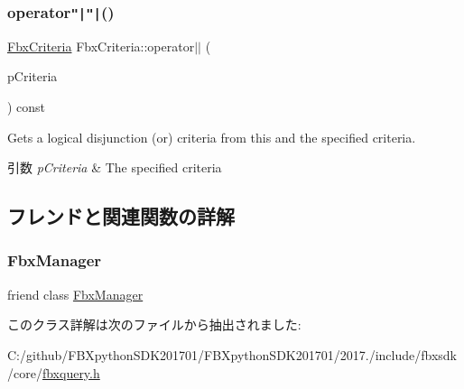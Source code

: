 \mbox{\label{class_fbx_criteria_a550446bf7c351b7cd09098bbe74d5d64}} 
\subsubsection{\texorpdfstring{operator\texttt{"|}\texttt{"|}()}{operator||()}}
{\footnotesize\ttfamily \hyperlink{class_fbx_criteria}{Fbx\+Criteria} Fbx\+Criteria\+::operator$\vert$$\vert$ (\begin{DoxyParamCaption}\item[{const \hyperlink{class_fbx_criteria}{Fbx\+Criteria} \&}]{p\+Criteria }\end{DoxyParamCaption}) const}

Gets a logical disjunction (or) criteria from this and the specified criteria. 
\begin{DoxyParams}{引数}
{\em p\+Criteria} & The specified criteria \\
\hline
\end{DoxyParams}


\subsection{フレンドと関連関数の詳解}
\mbox{\label{class_fbx_criteria_aa6292f0d09535e3fe957088d09276268}} 
\subsubsection{\texorpdfstring{Fbx\+Manager}{FbxManager}}
{\footnotesize\ttfamily friend class \hyperlink{class_fbx_manager}{Fbx\+Manager}\hspace{0.3cm}{\ttfamily [friend]}}



このクラス詳解は次のファイルから抽出されました\+:\begin{DoxyCompactItemize}
\item 
C\+:/github/\+F\+B\+Xpython\+S\+D\+K201701/\+F\+B\+Xpython\+S\+D\+K201701/2017./include/fbxsdk/core/\hyperlink{fbxquery_8h}{fbxquery.\+h}\end{DoxyCompactItemize}
